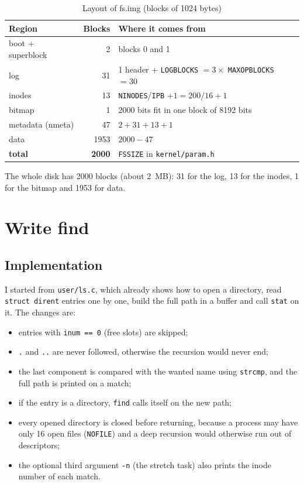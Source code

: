 \documentclass[12pt,a4paper]{article}
\begin{document}
\begin{table}[H]
  \centering
  \caption{Layout of fs.img (blocks of 1024 bytes)}
  \begin{tabular}{lrl}
    \toprule
    \textbf{Region} & \textbf{Blocks} & \textbf{Where it comes from} \\
    \midrule
    boot + superblock & 2    & blocks 0 and 1 \\
    log               & 31   & 1 header + \texttt{LOGBLOCKS} $= 3 \times$ \texttt{MAXOPBLOCKS} $= 30$ \\
    inodes            & 13   & \texttt{NINODES}/\texttt{IPB} $+ 1 = 200/16 + 1$ \\
    bitmap            & 1    & 2000 bits fit in one block of 8192 bits \\
    \midrule
    metadata (nmeta)  & 47   & $2 + 31 + 13 + 1$ \\
    data              & 1953 & $2000 - 47$ \\
    \midrule
    \textbf{total}    & \textbf{2000} & \texttt{FSSIZE} in \texttt{kernel/param.h} \\
    \bottomrule
  \end{tabular}
\end{table}

The whole disk has 2000 blocks (about 2~MB): 31 for the log, 13 for the inodes, 1 for the bitmap and 1953 for data.

\newpage
\section{Write find}

\subsection{Implementation}

I started from \texttt{user/ls.c}, which already shows how to open a directory, read \texttt{struct dirent} entries one by one, build the full path in a buffer and call \texttt{stat} on it. The changes are:
\begin{itemize}
  \item entries with \texttt{inum == 0} (free slots) are skipped;
  \item \texttt{.} and \texttt{..} are never followed, otherwise the recursion would never end;
  \item the last component is compared with the wanted name using \texttt{strcmp}, and the full path is printed on a match;
  \item if the entry is a directory, \texttt{find} calls itself on the new path;
  \item every opened directory is closed before returning, because a process may have only 16 open files (\texttt{NOFILE}) and a deep recursion would otherwise run out of descriptors;
  \item the optional third argument \texttt{-n} (the stretch task) also prints the inode number of each match.
\end{itemize}
\end{document}
